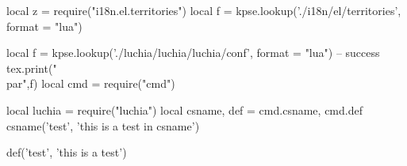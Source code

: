 \documentclass{article}
\begin{document}
\begin{luacode}
local z = require("i18n.el.territories")
local f = kpse.lookup('./i18n/el/territories', {format = "lua"})

local f = kpse.lookup('./luchia/luchia/luchia/conf', {format = "lua"})
-- success
tex.print("\\par",f)
local cmd = require("cmd")

local luchia = require("luchia")
local csname, def = cmd.csname, cmd.def
csname('test', 'this is a test in csname')

def('test', 'this is a test')
\end{luacode}

\test
\makeatletter
\@test

\textdblbar
\end{document}
